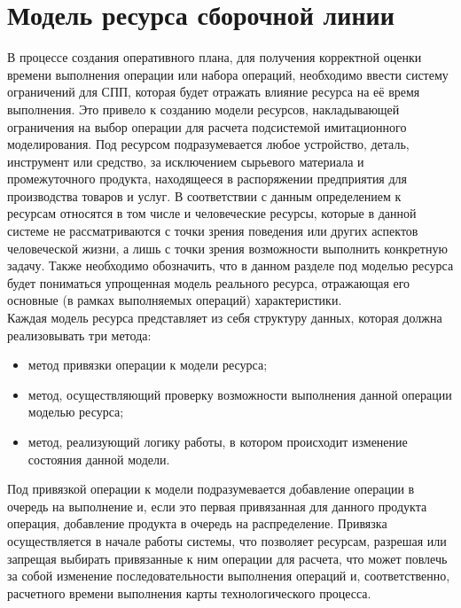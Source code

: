 \section{Модель ресурса сборочной линии}
\indent В процессе создания оперативного плана, для получения корректной оценки времени выполнения операции или набора операций, необходимо ввести систему ограничений для СПП, которая будет отражать влияние ресурса на её время выполнения.
Это привело к созданию модели ресурсов, накладывающей ограничения на выбор операции для расчета подсистемой имитационного моделирования.
Под ресурсом подразумевается любое устройство, деталь, инструмент или средство, за исключением сырьевого материала и промежуточного продукта, находящееся в распоряжении предприятия для производства товаров и услуг.
В соответствии с данным определением к ресурсам относятся в том числе и человеческие ресурсы, которые в данной системе не рассматриваются с точки зрения поведения или других аспектов человеческой жизни, а лишь с точки зрения возможности выполнить конкретную задачу.
Также необходимо обозначить, что в данном разделе под моделью ресурса будет пониматься упрощенная модель реального ресурса, отражающая его основные (в рамках выполняемых операций) характеристики.\\
\indent Каждая модель ресурса представляет из себя структуру данных, которая должна реализовывать три метода:
\begin{itemize}
	\item метод привязки операции к модели ресурса;
	\item метод, осуществляющий проверку возможности выполнения данной операции моделью ресурса;
	\item метод, реализующий логику работы, в котором происходит изменение состояния данной модели.
\end{itemize}

\indent Под привязкой операции к модели подразумевается добавление операции в очередь на выполнение и, если это первая привязанная для данного продукта операция, добавление продукта в очередь на распределение. Привязка осуществляется в начале работы системы, что позволяет ресурсам, разрешая или запрещая выбирать привязанные к ним операции для расчета, что может повлечь за собой изменение последовательности выполнения операций и, соответственно, расчетного времени выполнения карты технологического процесса.

